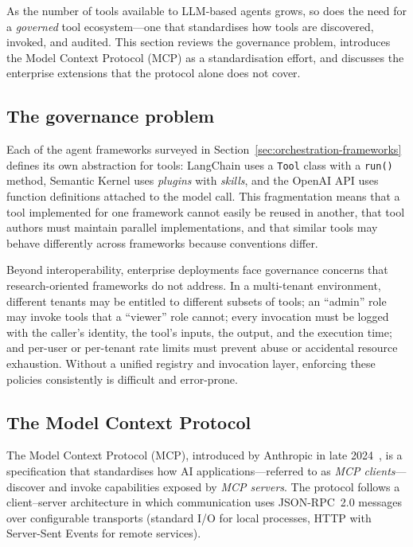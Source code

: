 \documentclass[a4paper]{sapthesis}
\begin{document}
As the number of tools available to LLM-based agents grows, so does the
need for a \emph{governed} tool ecosystem---one that standardises how tools
are discovered, invoked, and audited.  This section reviews the governance
problem, introduces the Model Context Protocol (MCP) as a standardisation
effort, and discusses the enterprise extensions that the protocol alone does
not cover.

\subsection{The governance problem}

Each of the agent frameworks surveyed in Section~\ref{sec:orchestration-frameworks}
defines its own abstraction for tools: LangChain uses a \texttt{Tool} class
with a \texttt{run()} method, Semantic Kernel uses \emph{plugins} with
\emph{skills}, and the OpenAI API uses function definitions attached to
the model call.  This fragmentation means that a tool implemented for one
framework cannot easily be reused in another, that tool authors must
maintain parallel implementations, and that similar tools may behave
differently across frameworks because conventions differ.

Beyond interoperability, enterprise deployments face governance concerns
that research-oriented frameworks do not address.  In a multi-tenant
environment, different tenants may be entitled to different subsets of
tools; an ``admin'' role may invoke tools that a ``viewer'' role cannot;
every invocation must be logged with the caller's identity, the tool's
inputs, the output, and the execution time; and per-user or per-tenant
rate limits must prevent abuse or accidental resource exhaustion.  Without
a unified registry and invocation layer, enforcing these policies
consistently is difficult and error-prone.

\subsection{The Model Context Protocol}

The Model Context Protocol (MCP), introduced by Anthropic in late
2024~\cite{anthropic2024mcp}, is a specification that standardises how
AI applications---referred to as \emph{MCP clients}---discover and invoke
capabilities exposed by \emph{MCP servers}.  The protocol follows a
client--server architecture in which communication uses JSON-RPC~2.0
messages over configurable transports (standard I/O for local processes,
HTTP with Server-Sent Events for remote services).
\end{document}
